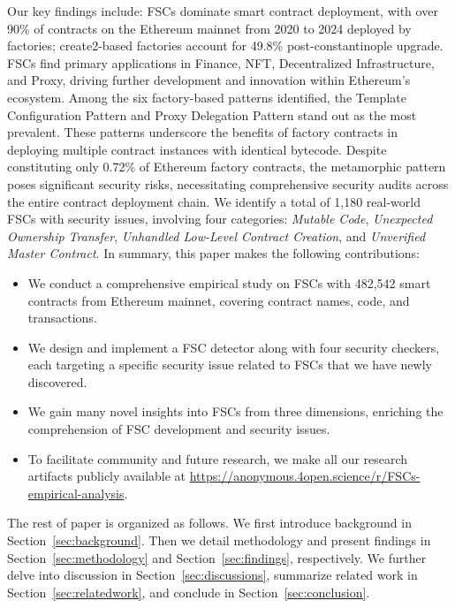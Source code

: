 \documentclass[acmsmall,screen]{acmart}
\begin{document}
	Our key findings include:  FSCs dominate smart contract deployment, with over 90\% of contracts on the Ethereum mainnet from 2020 to 2024 deployed by factories;  create2-based factories account for 49.8\% post-constantinople upgrade.  FSCs find primary applications in Finance, NFT, Decentralized Infrastructure, and Proxy, driving further development and innovation within Ethereum's ecosystem.  Among the six factory-based patterns identified, the Template Configuration Pattern and Proxy Delegation Pattern stand out as the most prevalent. These patterns underscore the benefits of factory contracts in deploying multiple contract instances with identical bytecode.  Despite constituting only 0.72\% of Ethereum factory contracts, the metamorphic pattern poses significant security risks, necessitating comprehensive security audits across the entire contract deployment chain.  We identify a total of 1,180 real-world FSCs with security issues, involving four categories: \textit{Mutable Code}, \textit{Unexpected Ownership Transfer}, \textit{Unhandled Low-Level Contract Creation}, and \textit{Unverified Master Contract}. In summary, this paper makes the following contributions:
	\begin{itemize}[leftmargin=0.4cm,topsep=0.1cm]
		\item We conduct a comprehensive empirical study on FSCs with 482,542 smart contracts from Ethereum mainnet, covering contract names, code, and transactions.
		\item We design and implement a FSC detector along with four security checkers, each targeting a specific security issue related to FSCs that we have newly discovered.
		\item We gain many novel insights into FSCs from three dimensions, enriching the comprehension of FSC development and security issues.
		\item To facilitate community and future research, we make all our research artifacts publicly available at \url{https://anonymous.4open.science/r/FSCs-empirical-analysis}.
	\end{itemize}

	The rest of paper is organized as follows. We first introduce background in Section~\ref{sec:background}. Then we detail methodology and present findings in Section~\ref{sec:methodology} and Section~\ref{sec:findings}, respectively. We further delve into discussion in Section~\ref{sec:discussions}, summarize related work in Section~\ref{sec:relatedwork}, and conclude in Section~\ref{sec:conclusion}.
\end{document}

